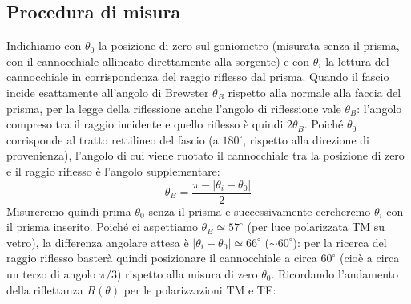 \documentclass[openany,a4paper,12pt]{book}
\begin{document}
\begin{figure}[H]
\label{fig:brewster}
\end{figure}
\subsection*{Procedura di misura}

Indichiamo con $\theta_0$ la posizione di zero sul goniometro (misurata senza il prisma, con il cannocchiale allineato direttamente alla sorgente) e con $\theta_i$ la lettura del cannocchiale in corrispondenza del raggio riflesso dal prisma.
Quando il fascio incide esattamente all'angolo di Brewster $\theta_B$ rispetto alla normale alla faccia del prisma, per la legge della riflessione anche l'angolo di riflessione vale $\theta_B$: l'angolo compreso tra il raggio incidente e quello riflesso è quindi $2\theta_B$.
Poiché $\theta_0$ corrisponde al tratto rettilineo del fascio (a $180^\circ$, rispetto alla direzione di provenienza), l'angolo di cui viene ruotato il cannocchiale tra la posizione di zero e il raggio riflesso è l'angolo supplementare:
\[
    \theta_B = \frac{\pi - |\theta_i - \theta_0|}{2}
\]
Misureremo quindi prima $\theta_0$ senza il prisma e successivamente cercheremo $\theta_i$ con il prisma inserito.
Poiché ci aspettiamo $\theta_B \simeq 57^\circ$ (per luce polarizzata TM su vetro), la differenza angolare attesa è $|\theta_i - \theta_0| \simeq 66^\circ$ ($\sim 60^\circ$): per la ricerca del raggio riflesso basterà quindi posizionare il cannocchiale a circa $60^\circ$ (cioè a circa un terzo di angolo $\pi/3$) rispetto alla misura di zero $\theta_0$.
Ricordando l'andamento della riflettanza $R(\theta)$ per le polarizzazioni TM e TE:
\end{document}
